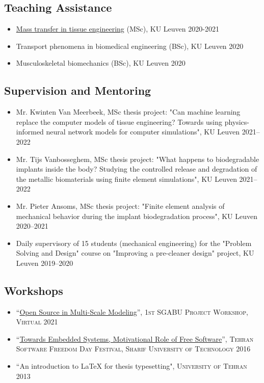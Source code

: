\documentclass{cv}
\begin{document}
\subsection{Teaching Assistance}


\begin{itemize}
\item 
\href{https://github.com/mbarzegary/mass-transport-tissue-engineering-spring2021}{Mass transfer in tissue engineering} (MSc), KU Leuven \hfill 2020-2021
\item 
Transport phenomena in biomedical engineering (BSc), KU Leuven \hfill 2020
\item 
Musculoskeletal biomechanics (BSc), KU Leuven \hfill 2020
\end{itemize}
	
\subsection{Supervision and Mentoring}

\begin{itemize}
\item 
Mr. Kwinten Van Meerbeek, MSc thesis project: "Can machine learning replace the computer models of tissue engineering? Towards using physics-informed neural network models for computer simulations", KU Leuven \hfill 2021--2022
\item 
Mr. Tijs Vanbosseghem, MSc thesis project: "What happens to biodegradable implants inside the body? Studying the controlled release and
degradation of the metallic biomaterials using finite element simulations", KU Leuven \hfill 2021--2022
\item 
Mr. Pieter Ansoms, MSc thesis project: "Finite element analysis of mechanical behavior during the implant biodegradation process", KU Leuven \hfill 2020--2021
\item
Daily supervisory of 15 students (mechanical engineering) for the "Problem Solving and Design" course on "Improving a pre-cleaner design" project, KU Leuven \hfill 2019--2020
\end{itemize}

\subsection{Workshops}

\begin{itemize}
\item
``\href{https://www.youtube.com/watch?v=3nIExqK49n4}{Open Source in Multi-Scale Modeling}'', \textsc{1st SGABU Project Workshop, Virtual} \hfill 2021
\item
``\href{https://www.slideshare.net/tehsfd/embedded-system-70659214}{Towards Embedded Systems, Motivational Role of Free Software}'', \textsc{Tehran Software Freedom Day Festival, Sharif University of Technology} \hfill 2016
\item
``An introduction to \LaTeX{} for thesis typesetting", \textsc{University of Tehran} \hfill 2013
\end{itemize}
\end{document}
